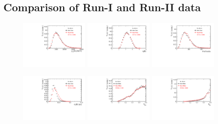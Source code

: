 \clearpage
\subsection{Comparison of Run-I and Run-II data}

\begin{figure}[h]
\centering
\includegraphics[height=!,width=0.3\textwidth]{figs/dataVsMC/run1vs2_norm/Ds2all_Bs_PT.pdf}
\includegraphics[height=!,width=0.3\textwidth]{figs/dataVsMC/run1vs2_norm/Ds2all_Bs_ETA.pdf}
\includegraphics[height=!,width=0.3\textwidth]{figs/dataVsMC/run1vs2_norm/Ds2all_NTracks.pdf}


\includegraphics[height=!,width=0.3\textwidth]{figs/dataVsMC/run1vs2_norm/Ds2all_Bs_DTF_TAUERR.pdf}
\includegraphics[height=!,width=0.3\textwidth]{figs/dataVsMC/run1vs2_norm/Ds2all_Bs_TAGOMEGA_OS.pdf}
\includegraphics[height=!,width=0.3\textwidth]{figs/dataVsMC/run1vs2_norm/Ds2all_Bs_SS_nnetKaon_PROB.pdf}


\end{figure}
